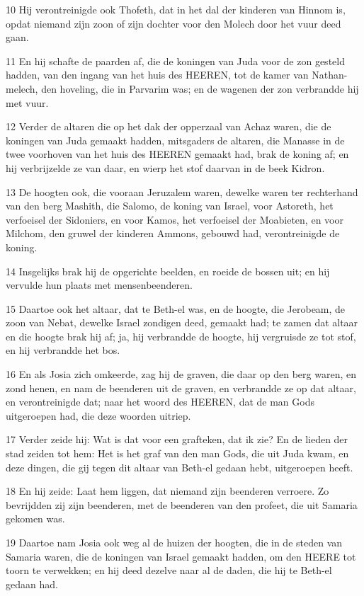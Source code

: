 \par 10 Hij verontreinigde ook Thofeth, dat in het dal der kinderen van Hinnom is, opdat niemand zijn zoon of zijn dochter voor den Molech door het vuur deed gaan.
\par 11 En hij schafte de paarden af, die de koningen van Juda voor de zon gesteld hadden, van den ingang van het huis des HEEREN, tot de kamer van Nathan-melech, den hoveling, die in Parvarim was; en de wagenen der zon verbrandde hij met vuur.
\par 12 Verder de altaren die op het dak der opperzaal van Achaz waren, die de koningen van Juda gemaakt hadden, mitsgaders de altaren, die Manasse in de twee voorhoven van het huis des HEEREN gemaakt had, brak de koning af; en hij verbrijzelde ze van daar, en wierp het stof daarvan in de beek Kidron.
\par 13 De hoogten ook, die vooraan Jeruzalem waren, dewelke waren ter rechterhand van den berg Mashith, die Salomo, de koning van Israel, voor Astoreth, het verfoeisel der Sidoniers, en voor Kamos, het verfoeisel der Moabieten, en voor Milchom, den gruwel der kinderen Ammons, gebouwd had, verontreinigde de koning.
\par 14 Insgelijks brak hij de opgerichte beelden, en roeide de bossen uit; en hij vervulde hun plaats met mensenbeenderen.
\par 15 Daartoe ook het altaar, dat te Beth-el was, en de hoogte, die Jerobeam, de zoon van Nebat, dewelke Israel zondigen deed, gemaakt had; te zamen dat altaar en die hoogte brak hij af; ja, hij verbrandde de hoogte, hij vergruisde ze tot stof, en hij verbrandde het bos.
\par 16 En als Josia zich omkeerde, zag hij de graven, die daar op den berg waren, en zond henen, en nam de beenderen uit de graven, en verbrandde ze op dat altaar, en verontreinigde dat; naar het woord des HEEREN, dat de man Gods uitgeroepen had, die deze woorden uitriep.
\par 17 Verder zeide hij: Wat is dat voor een grafteken, dat ik zie? En de lieden der stad zeiden tot hem: Het is het graf van den man Gods, die uit Juda kwam, en deze dingen, die gij tegen dit altaar van Beth-el gedaan hebt, uitgeroepen heeft.
\par 18 En hij zeide: Laat hem liggen, dat niemand zijn beenderen verroere. Zo bevrijdden zij zijn beenderen, met de beenderen van den profeet, die uit Samaria gekomen was.
\par 19 Daartoe nam Josia ook weg al de huizen der hoogten, die in de steden van Samaria waren, die de koningen van Israel gemaakt hadden, om den HEERE tot toorn te verwekken; en hij deed dezelve naar al de daden, die hij te Beth-el gedaan had.
